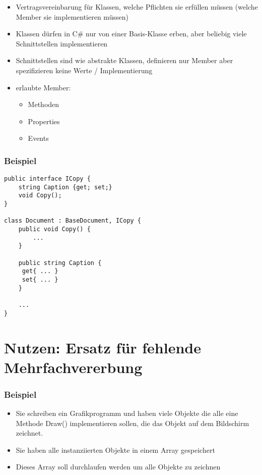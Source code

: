 \begin{itemize}
\item Vertragsvereinbarung für Klassen, welche Pflichten sie erfüllen müssen (welche Member sie implementieren müssen)
\item Klassen dürfen in C\# nur von einer Basis-Klasse erben, aber beliebig viele Schnittstellen implementieren
\item Schnittstellen sind wie abstrakte Klassen, definieren nur Member aber spezifizieren keine Werte / Implementierung
\item erlaubte Member: 

\begin{itemize}
\item Methoden
\item Properties
\item Events
\end{itemize}
\end{itemize}

\subsubsection*{Beispiel}

\begin{lstlisting}[language={[Sharp]C}]
public interface ICopy {
	string Caption {get; set;}
	void Copy();
}

class Document : BaseDocument, ICopy {
	public void Copy() {
		...
	}
	
	public string Caption {
	 get{ ... }
	 set{ ... }
	}
	
	...
}
\end{lstlisting}

\section{Nutzen: Ersatz für fehlende Mehrfachvererbung}

\subsubsection*{Beispiel}

\begin{itemize}
\item Sie schreiben ein Grafikprogramm und haben viele Objekte die alle eine Methode Draw() implementieren sollen, die das Objekt auf dem Bildschirm zeichnet. 
\item Sie haben alle instanziierten Objekte in einem Array gespeichert
\item Dieses Array soll durchlaufen werden um alle Objekte zu zeichnen
\end{itemize}

